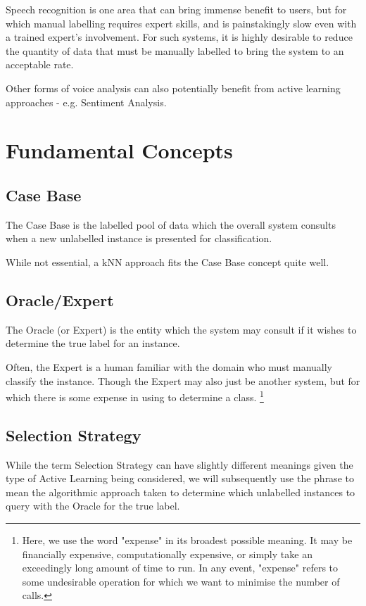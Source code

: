 \documentclass[a4paper,11pt]{report}
\begin{document}
Speech recognition is one area that can bring immense benefit to users, but for which manual labelling requires expert skills, and is painstakingly slow even with a trained expert's involvement. For such systems, it is highly desirable to reduce the quantity of data that must be manually labelled to bring the system to an acceptable rate.

Other forms of voice analysis can also potentially benefit from active learning approaches - e.g. Sentiment Analysis.

\section{Fundamental Concepts}
\subsection{Case Base}
The Case Base is the labelled pool of data which the overall system consults when a new unlabelled instance is presented for classification.

While not essential, a kNN approach fits the Case Base concept quite well.

\subsection{Oracle/Expert}
The Oracle (or Expert) is the entity which the system may consult if it wishes to determine the true label for an instance.

Often, the Expert is a human familiar with the domain who must manually classify the instance. Though the Expert may also just be another system, but for which there is some expense in using to determine a class. \footnote{Here, we use the word "expense" in its broadest possible meaning. It may be financially expensive, computationally expensive, or simply take an exceedingly long amount of time to run. In any event, "expense" refers to some undesirable operation for which we want to minimise the number of calls.}

\subsection{Selection Strategy}
While the term Selection Strategy can have slightly different meanings given the type of Active Learning being considered, we will subsequently use the phrase to mean the algorithmic approach taken to determine which unlabelled instances to query with the Oracle for the true label.
\end{document}
